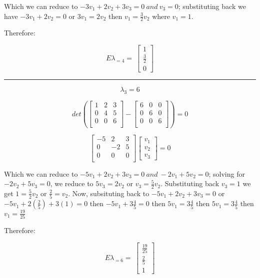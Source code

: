 \documentclass[]{article}
\begin{document}
Which we can reduce to \(-3v_1+2v_2+3v_3 = 0~and~v_3 =0\); substituting
back we have \(-3v_1+2v_2=0\) or \(3v_1=2v_2\) then
\(v_1=\frac{3}{2}v_2\) where \(v_1 =1\).

Therefore:

\[
E\lambda_{=4} = \
\begin{bmatrix}
1 \\
\frac{3}{2} \\
0
\end{bmatrix}
\]

\begin{center}\rule{0.5\linewidth}{\linethickness}\end{center}

\[\lambda_3 = 6\]

\[
det( 
\begin{bmatrix}
   1 & 2 & 3 \\
   0 & 4 & 5 \\
   0 & 0 & 6 \\
\end{bmatrix}
-
\begin{bmatrix}
   6 & 0 & 0 \\
   0 & 6 & 0 \\
   0 & 0 & 6 \\
\end{bmatrix}
) = 0
\]

\[
\begin{bmatrix}
   -5 & 2 & 3 \\
   0 & -2 & 5 \\
   0 & 0 & 0 \\
\end{bmatrix}
\begin{bmatrix}
v_1 \\
v_2 \\
v_3
\end{bmatrix}
=0
\]

Which we can reduce to \(-5v_1+2v_2+3v_3 = 0~and~-2v_1+5v_2=0\); solving
for \(-2v_2+5v_3=0\), we reduce to \(5v_3=2v_2\) or
\(v_3=\frac{5}{2}v_2\). Substituting back \(v_3=1\) we get
\(1=\frac{5}{2}v_2\) or \(\frac{2}{5}=v_2\). Now, subsituting back to
\(-5v_1+2v_2+3v_3 = 0\) or \(-5v_1+2(\frac{2}{5})+3(1) = 0\) then
\(-5v_1+3\frac{4}{5}= 0\) then \(5v_1= 3\frac{4}{5}\) then
\(5v_1= 3\frac{4}{5}\) then \(v_1= \frac{19}{25}\)

Therefore:

\[
E\lambda_{=6} = \
\begin{bmatrix}
\frac{19}{25} \\
\frac{2}{5} \\
1
\end{bmatrix}
\]
\end{document}
